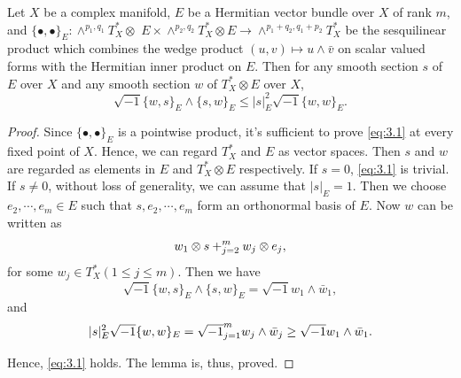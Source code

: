 \documentclass[lang=en,12pt,twoside]{textbook}
\let\sum\relax
\begin{document}

\begin{lemma}\label{lem:lagrange}
  Let $X$ be a complex manifold, $E$ be a Hermitian vector bundle over $X$ of rank $m$, and $\{\bullet, \bullet\}_E: \wedge^{p_1, q_1} T_X^* \otimes$ $E \times \wedge^{p_2, q_2} T_X^* \otimes E \longrightarrow \wedge^{p_1+q_2, q_1+p_2} T_X^*$ be the sesquilinear product which combines the wedge product $(u, v) \mapsto u \wedge \bar{v}$ on scalar valued forms with the Hermitian inner product on $E$. Then for any smooth section $s$ of $E$ over $X$ and any smooth section $w$ of $T_X^* \otimes E$ over $X$,
\begin{equation}\label{eq:3.1}
    \sqrt{-1}\{w, s\}_E \wedge\{s, w\}_E \leq|s|_E^2 \sqrt{-1}\{w, w\}_E .
\end{equation}
\end{lemma}

\begin{proof}
  Since $\{\bullet, \bullet\}_E$ is a pointwise product, it's sufficient to prove \eqref{eq:3.1}  at every fixed point of $X$. Hence, we can regard $T_X^*$ and $E$ as vector spaces. Then $s$ and $w$ are regarded as elements in $E$ and $T_X^* \otimes E$ respectively. If $s=0$, \eqref{eq:3.1} is trivial. If $s \neq 0$, without loss of generality, we can assume that $|s|_E=1$. Then we choose $e_2, \cdots, e_m \in E$ such that $s, e_2, \cdots, e_m$ form an orthonormal basis of $E$. Now $w$ can be written as
  $$
  w_1 \otimes s+\sum_{j=2}^m w_j \otimes e_j,
  $$
  for some $w_j \in T_X^*(1 \leq j \leq m)$. Then we have
  $$
  \sqrt{-1}\{w, s\}_E \wedge\{s, w\}_E=\sqrt{-1} w_1 \wedge \bar{w}_1,
  $$
  and
  $$
  |s|_E^2 \sqrt{-1}\{w, w\}_E=\sqrt{-1} \sum_{j=1}^m w_j \wedge \bar{w}_j \geq \sqrt{-1} w_1 \wedge \bar{w}_1 .
  $$
  
  Hence, \eqref{eq:3.1} holds. The lemma is, thus, proved.
\end{proof}
\end{document}
